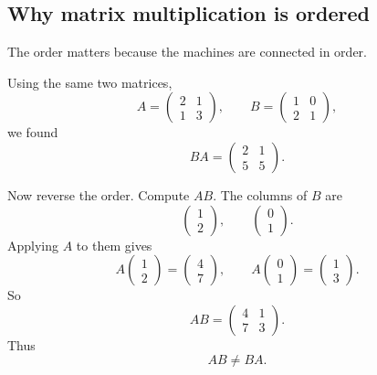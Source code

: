 \subsection{Why matrix multiplication is ordered}

The order matters because the machines are connected in order.

Using the same two matrices,
\[
    A=
    \begin{pmatrix}
        2&1\\
        1&3
    \end{pmatrix},
    \qquad
    B=
    \begin{pmatrix}
        1&0\\
        2&1
    \end{pmatrix},
\]
we found
\[
    BA=
    \begin{pmatrix}
        2&1\\
        5&5
    \end{pmatrix}.
\]

Now reverse the order.  Compute \(AB\).  The columns of \(B\) are
\[
    \begin{pmatrix}1\\2\end{pmatrix},
    \qquad
    \begin{pmatrix}0\\1\end{pmatrix}.
\]
Applying \(A\) to them gives
\[
    A\begin{pmatrix}1\\2\end{pmatrix}
    =
    \begin{pmatrix}4\\7\end{pmatrix},
    \qquad
    A\begin{pmatrix}0\\1\end{pmatrix}
    =
    \begin{pmatrix}1\\3\end{pmatrix}.
\]
So
\[
    AB=
    \begin{pmatrix}
        4&1\\
        7&3
    \end{pmatrix}.
\]
Thus
\[
    AB\neq BA.
\]

